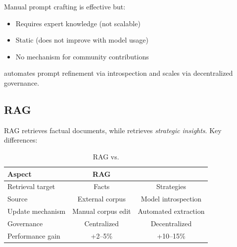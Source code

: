 Manual prompt crafting is effective but:

\begin{itemize}
    \item Requires expert knowledge (not scalable)
    \item Static (does not improve with model usage)
    \item No mechanism for community contributions
\end{itemize}

\textbf{\DSO{}} automates prompt refinement via introspection and scales via decentralized governance.

\subsection{RAG}

RAG retrieves factual documents, while \DSO{} retrieves \textit{strategic insights}. Key differences:

\begin{table}[t]
\centering
\caption{RAG vs. \DSO{}}
\label{tab:rag-vs-dso}
\begin{tabular}{lcc}
\toprule
\textbf{Aspect} & \textbf{RAG} & \textbf{\DSO{}} \\
\midrule
Retrieval target & Facts & Strategies \\
Source & External corpus & Model introspection \\
Update mechanism & Manual corpus edit & Automated extraction \\
Governance & Centralized & Decentralized \DAO{} \\
Performance gain & +2--5\% & +10--15\% \\
\bottomrule
\end{tabular}
\end{table}

